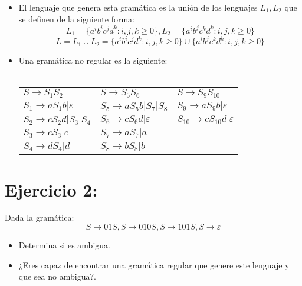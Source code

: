 \documentclass{article}
\begin{document}
\begin{itemize}
	\item El lenguaje que genera esta gramática es la unión de los lenguajes $L_1, L_2$ que se definen de la siguiente forma:\\
$$L_1 = \{ a^ib^ic^jd^k : i,j,k \geq 0\}, 
L_2 = \{ a^ib^jc^kd^k : i,j,k \geq 0\}$$
$$L = L_1\cup L_2 = \{ a^ib^ic^jd^k : i,j,k \geq 0\}\cup \{ a^ib^jc^kd^k : i,j,k \geq 0\}$$
	\item Una gramática no regular es la siguiente:\\\\
	\begin{tabular}{l|l|l}
	$S\rightarrow S_1S_2$ & $S\rightarrow S_5S_6$ & $S\rightarrow S_9S_{10}$ \\
	$S_1\rightarrow aS_1b | \varepsilon$ & $S_5\rightarrow aS_5b | S_7 | S_8$ & $S_9\rightarrow aS_9b | \varepsilon$ \\
	$S_2\rightarrow cS_2d | S_3 | S_4$ & $S_6\rightarrow cS_6d|\varepsilon$ & $S_{10}\rightarrow cS_{10}d | \varepsilon$\\
	$S_3\rightarrow cS_3 | c$ & $S_7\rightarrow aS_7 | a$ & \\ 
	$S_4\rightarrow dS_4 | d$ & $S_8\rightarrow bS_8 | b$ & \\
	\end{tabular} 
\end{itemize}

\section*{Ejercicio 2:}
Dada la gramática:
$$S\rightarrow 01S, S\rightarrow 010S, S\rightarrow 101S, S\rightarrow  \varepsilon$$
\begin{itemize}
	\item Determina si es ambigua.
	\item ¿Eres capaz de encontrar una gramática regular que genere este lenguaje y que sea no ambigua?.
\end{itemize}
\end{document}
